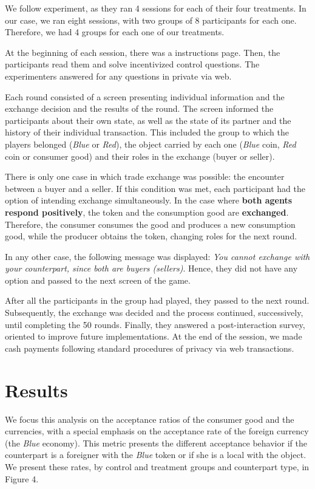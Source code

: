 We follow \cite{JiangZhang} experiment, as they ran 4 sessions for each of their four treatments. In our case, we ran eight sessions, with two groups of 8 participants for each one. Therefore, we had 4 groups for each one of our treatments. 

At the beginning of each session, there was a instructions page. Then, the participants read them and solve incentivized control questions. The experimenters answered for any questions in private via web. 

Each round consisted of a screen presenting individual information and the exchange decision and the results of the round. The screen informed the participants about their own state, as well as the state of its partner and the history of their individual transaction. This included the group to which the players belonged (\textit{Blue} or \textit{Red}), the object carried by each one (\textit{Blue} coin, \textit{Red} coin or consumer good) and their roles in the exchange (buyer or seller). 

There is only one case in which trade exchange was possible: the encounter between a buyer and a seller. If this condition was met, each participant had the option of intending exchange simultaneously. In the case where \textbf{both agents respond positively}, the token and the consumption good are \textbf{exchanged}. Therefore, the consumer consumes the good and produces a new consumption good, while the producer obtains the token, changing roles for the next round.

In any other case, the following message was displayed: \textit{You cannot exchange with your counterpart, since both are buyers (sellers)}. Hence, they did not have any option and passed to the next screen of the game. 

After all the participants in the group had played, they passed to the next round. Subsequently, the exchange was decided and the process continued, successively, until completing the 50 rounds. Finally, they answered a post-interaction survey, oriented to improve future implementations. At the end of the session, we made cash payments following standard procedures of privacy via web transactions. 


\section{Results}

We focus this analysis on the acceptance ratios of the consumer good and the currencies, with a special emphasis on the acceptance rate of the foreign currency (the \textit{\textit{Blue}} economy). This metric presents the different acceptance behavior if the counterpart is a foreigner with the \textit{Blue} token or if she is a local with the object. We present these rates, by control and treatment groups and counterpart type, in Figure 4. 

